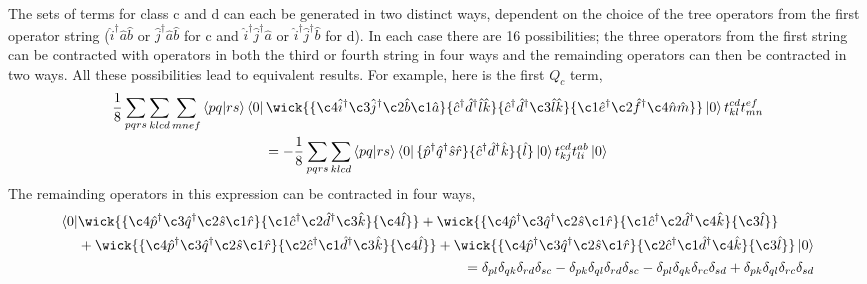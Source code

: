The sets of terms for class c and d can each be generated in two distinct
ways, dependent on the choice of the tree operators from the first operator
string ($\hat{i}^\dagger \hat{a} \hat{b}$ or 
$\hat{j}^\dagger \hat{a} \hat{b}$ for c and 
$\hat{i}^\dagger \hat{j}^\dagger \hat{a}$ or 
$\hat{i}^\dagger \hat{j}^\dagger \hat{b}$ for d). In each case there 
are 16 possibilities; the three operators from the first string can be 
contracted with operators in both the third or fourth string in four ways and
the remainding operators can then be contracted in two ways. All these
possibilities lead to equivalent results. For example, here is the first 
$Q_c$ term,
\begin{equation}
    \begin{gathered}
    \frac{1}{8} \sum_{pqrs} \sum_{klcd} \sum_{mnef}
    \bra{pq} \ket{rs} \bra{0}
        \wick{
        \{\c4{\hat{i}}^\dagger \c3{\hat{j}}^\dagger \c2{\hat{b}} \c1{\hat{a}} \}
        \{\hat{c}^\dagger \hat{d}^\dagger \hat{l} \hat{k} \} 
        \{\hat{c}^\dagger \hat{d}^\dagger \c3{\hat{l}} \hat{k} \}
        \{\c1{\hat{e}}^\dagger \c2{\hat{f}}^\dagger \c4{\hat{n}} \hat{m} \}
        }
    \ket{0} t^{cd}_{kl} t^{ef}_{mn} \\
    = - \frac{1}{8} \sum_{pqrs} \sum_{klcd}
    \bra{pq} \ket{rs} \bra{0} 
        \{\hat{p}^\dagger \hat{q}^\dagger \hat{s} \hat{r} \}
        \{\hat{c}^\dagger \hat{d}^\dagger \hat{k} \}
        \{\hat{l} \}
    \ket{0} t^{cd}_{kj} t^{ab}_{li}
    \ket{0}
    \end{gathered}
\end{equation}
The remainding operators in this expression can be contracted in four ways,
\begin{align}
    \begin{aligned}
        \bra{0}&
        \wick{
        \{\c4{\hat{p}}^\dagger \c3{\hat{q}}^\dagger \c2{\hat{s}} \c1{\hat{r}}\}
        \{\c1{\hat{c}}^\dagger \c2{\hat{d}}^\dagger \c3{\hat{k}} \}
        \{\c4{\hat{l}} \}
        }
        +
        \wick{
        \{\c4{\hat{p}}^\dagger \c3{\hat{q}}^\dagger \c2{\hat{s}} \c1{\hat{r}}\}
        \{\c1{\hat{c}}^\dagger \c2{\hat{d}}^\dagger \c4{\hat{k}} \}
        \{\c3{\hat{l}} \}
        } \\
        &+
        \wick{
        \{\c4{\hat{p}}^\dagger \c3{\hat{q}}^\dagger \c2{\hat{s}} \c1{\hat{r}}\}
        \{\c2{\hat{c}}^\dagger \c1{\hat{d}}^\dagger \c3{\hat{k}} \}
        \{\c4{\hat{l}} \}
        }
        +
        \wick{
        \{\c4{\hat{p}}^\dagger \c3{\hat{q}}^\dagger \c2{\hat{s}} \c1{\hat{r}}\}
        \{\c2{\hat{c}}^\dagger \c1{\hat{d}}^\dagger \c4{\hat{k}} \}
        \{\c3{\hat{l}} \}
        } \ket{0}
    \end{aligned} \\
    = \delta_{pl} \delta_{qk} \delta_{rd} \delta_{sc}
    - \delta_{pk} \delta_{ql} \delta_{rd} \delta_{sc}
    - \delta_{pl} \delta_{qk} \delta_{rc} \delta_{sd}
    + \delta_{pk} \delta_{ql} \delta_{rc} \delta_{sd}
\end{align}
